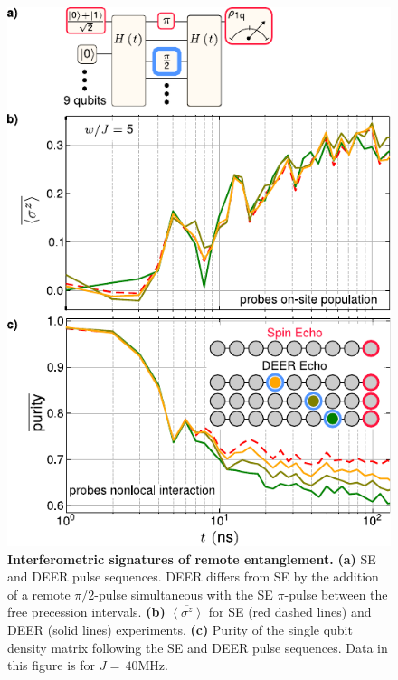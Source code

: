 \begin{figure}[tb]
    \centering
    \includegraphics[width=89 mm]{./PDF/f4_190731_416p.pdf}
    \caption{\small
    \textbf{Interferometric signatures of remote entanglement.}
    \textbf{(a)} SE and DEER pulse sequences.
    DEER differs from SE by the addition of a remote $\pi / 2$-pulse simultaneous with the SE $\pi$-pulse between the free precession intervals.
    \textbf{(b)} $\overline{ \left< \sigma^z \right> }$ for SE (red dashed lines) and DEER (solid lines) experiments.
    \textbf{(c)} Purity of the single qubit density matrix following the SE and DEER pulse sequences.
    Data in this figure is for $J=\,40 \text{MHz}$.
    }
    \label{fig_3}
\end{figure}
\afterpage{\FloatBarrier}

